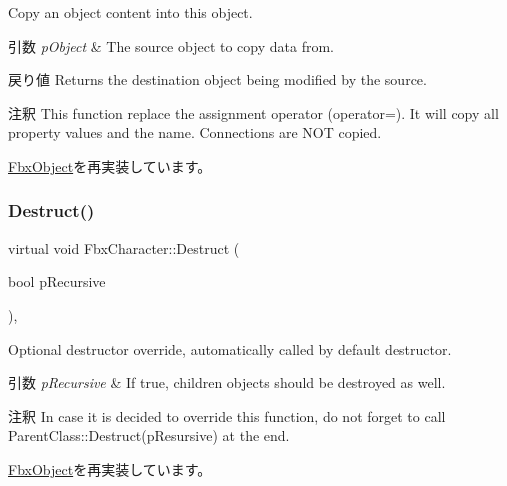 Copy an object content into this object. 
\begin{DoxyParams}{引数}
{\em p\+Object} & The source object to copy data from. \\
\hline
\end{DoxyParams}
\begin{DoxyReturn}{戻り値}
Returns the destination object being modified by the source. 
\end{DoxyReturn}
\begin{DoxyRemark}{注釈}
This function replace the assignment operator (operator=). It will copy all property values and the name. Connections are N\+OT copied. 
\end{DoxyRemark}


\hyperlink{class_fbx_object_a0c0c5adb38284d14bb82c04d54504a3e}{Fbx\+Object}を再実装しています。

\mbox{\label{class_fbx_character_a6a5bb02a06df228598ebfc4158c30b29}} 
\subsubsection{\texorpdfstring{Destruct()}{Destruct()}}
{\footnotesize\ttfamily virtual void Fbx\+Character\+::\+Destruct (\begin{DoxyParamCaption}\item[{bool}]{p\+Recursive }\end{DoxyParamCaption})\hspace{0.3cm}{\ttfamily [protected]}, {\ttfamily [virtual]}}

Optional destructor override, automatically called by default destructor. 
\begin{DoxyParams}{引数}
{\em p\+Recursive} & If true, children objects should be destroyed as well. \\
\hline
\end{DoxyParams}
\begin{DoxyRemark}{注釈}
In case it is decided to override this function, do not forget to call Parent\+Class\+::\+Destruct(p\+Resursive) at the end. 
\end{DoxyRemark}


\hyperlink{class_fbx_object_a123e084d9b32b29c28af6384b7c3c608}{Fbx\+Object}を再実装しています。

\mbox{\label{class_fbx_character_adca9207dfaffda7b98ea1b70c88fa0f3}} 
